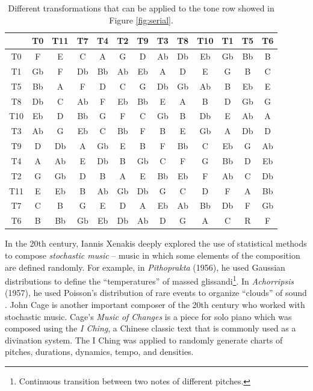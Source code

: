 \begin{table}[h]
    \centering
    \begin{tabular}{ccccccccccccc}
    & T0 & T11 & T7 & T4 & T2 & T9 & T3 & T8 & T10 & T1 & T5 & T6 \\
    \midrule
    T0  & F  & E & C  & A  & G  & D  & Ab & Db & Eb & Gb & Bb & B \\
    T1  & Gb & F & Db & Bb & Ab & Eb & A  & D  & E  & G  & B  & C \\
    T5  & Bb & A & F  & D  & C  & G  & Db & Gb & Ab & B  & Eb & E \\
    T8  & Db & C & Ab & F  & Eb & Bb & E  & A  & B  & D  & Gb & G \\
    T10 & Eb & D & Bb & G  & F  & C  & Gb & B  & Db & E  & Ab & A \\
    T3  & Ab & G & Eb & C  & Bb & F  & B  & E  & Gb & A  & Db & D \\
    T9  & D  & Db & A  & Gb & E & B  & F  & Bb & C & Eb  & G & Ab \\
    T4  & A  & Ab & E  & Db & B & Gb  & C  & F & G & Bb  & D & Eb \\
    T2  & G  & Gb & D  & B  & A  & E  & Bb & Eb & F  & Ab & C & Db \\
    T11 & E  & Eb & B  & Ab & Gb & Db & G  & C  & D  & F  & A & Bb \\
    T7  & C  & B  & G  & E  & D  & A  & Eb & Ab & Bb & Db & F & Gb \\
    T6  & B  & Bb & Gb & Eb & Db & Ab & D  & G  & A  & C  & R & F\\
    \bottomrule
    \end{tabular}
    \caption{Different transformations that can be applied to the tone row showed in Figure \ref{fig:serial}.}
    \label{tab:serial}
\end{table}

In the 20th century, Iannis Xenakis deeply explored the use of statistical methods to compose \textit{stochastic music} \cite{xenakis1992formalized} -- music in which some elements of the composition are defined randomly. For example, in \textit{Pithoprakta} (1956), he used Gaussian distributions to define the ``temperatures'' of massed glissandi\footnote{Continuous transition between two notes of different pitches.}. In \textit{Achorripsis} (1957), he used Poisson's distribution of rare events to organize ``clouds'' of sound \cite{ames1987automated}. John Cage is another important composer of the 20th century who worked with stochastic music. Cage's \textit{Music of Changes} is a piece for solo piano which was composed using the \textit{I Ching}, a Chinese classic text that is commonly used as a divination system. The I Ching was applied to randomly generate charts of pitches, durations, dynamics, tempo, and densities.

